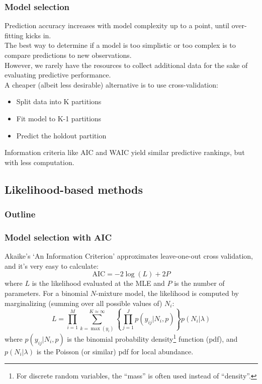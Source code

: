 \documentclass[color=usenames,dvipsnames]{beamer}\usepackage[]{graphicx}\usepackage[]{color}
\begin{document}
\begin{frame}
  \frametitle{Model selection}
  Prediction accuracy increases with model complexity up to a point,
  until over-fitting kicks in. \\
  \pause
  \vfill
  The best way to determine if a model is too simplistic or too
  complex is to compare predictions to new observations. \\
  \pause
  \vfill
  However, we rarely have the resources to
  collect additional data for the sake of evaluating predictive
  performance. \\ 
  \pause
  \vfill
  A cheaper (albeit less desirable) alternative is to use
  cross-validation: 
  \begin{itemize}
    \item Split data into K partitions
    \item Fit model to K-1 partitions
    \item Predict the holdout partition
  \end{itemize}
  \pause
  \vfill
  Information criteria like AIC and WAIC yield similar predictive
  rankings, but with less computation.    
\end{frame}



\subsection{Likelihood-based methods}



\begin{frame}
  \frametitle{Outline}
  \Large
\end{frame}



\bgroup
\let\oldfootnoterule\footnoterule
\def\footnoterule{\only<3->\oldfootnoterule}
\begin{frame}
  \frametitle{Model selection with AIC}
  \small
  Akaike's `An Information Criterion' approximates leave-one-out
  cross validation, and it's very easy to calculate:
  \[
     \mathrm{AIC} = -2 \log(L) + 2P 
   \]
   where $L$ is the likelihood evaluated at the MLE and $P$ is
   the number of parameters.
  \pause
  \vfill
  For a binomial $N$-mixture model, the likelihood is computed by
  marginalizing (summing over all possible values of) $N_i$:
  \[
     L = \prod_{i=1}^M \sum_{k=\max(y_i)}^{K\approx \infty}
     \left\{\prod_{j=1}^J p(y_{ij}|N_i,p)\right\}p(N_i|\lambda)
  \]
  \pause
  where $p(y_{ij}|N_i,p)$ is the binomial probability
  density\footnote<3->{\scriptsize For discrete random variables, the  
    ``mass'' is often used instead of ``density''.} function 
  (pdf), and $p(N_i|\lambda)$ is the Poisson (or similar) pdf for
  local abundance. 
\end{frame}
\egroup
\end{document}
